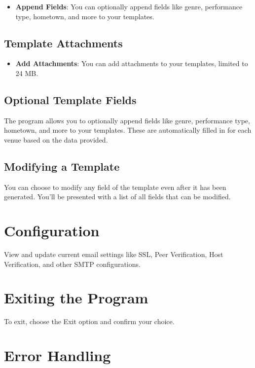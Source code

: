 \documentclass{article}
\begin{document}
	\begin{itemize}
		\item \textbf{Append Fields}: You can optionally append fields like genre, performance type, hometown, and more to your templates.
	\end{itemize}
	
	\subsection{Template Attachments}
	
	\begin{itemize}
		\item \textbf{Add Attachments}: You can add attachments to your templates, limited to 24 MB.
	\end{itemize}
	
	\subsection{Optional Template Fields}
	
	The program allows you to optionally append fields like genre, performance type, hometown, and more to your templates. These are automatically filled in for each venue based on the data provided.
	
	\subsection{Modifying a Template}
	
	You can choose to modify any field of the template even after it has been generated. You'll be presented with a list of all fields that can be modified.
	
	\section{Configuration}
	
	View and update current email settings like SSL, Peer Verification, Host Verification, and other SMTP configurations.
	
	\section{Exiting the Program}
	
	To exit, choose the Exit option and confirm your choice.
	
	\section{Error Handling}
	
\end{document}
